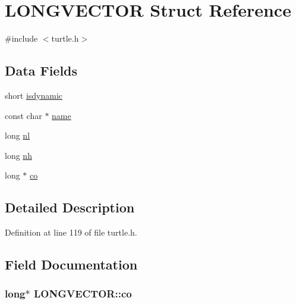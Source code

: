 \hypertarget{struct_l_o_n_g_v_e_c_t_o_r}{\section{L\-O\-N\-G\-V\-E\-C\-T\-O\-R Struct Reference}
\label{struct_l_o_n_g_v_e_c_t_o_r}
}


{\ttfamily \#include $<$turtle.\-h$>$}

\subsection*{Data Fields}
\begin{DoxyCompactItemize}
\item 
short \hyperlink{struct_l_o_n_g_v_e_c_t_o_r_a8a2b78c0cfb3a6b507f3eb1b40544c48}{isdynamic}
\item 
const char $\ast$ \hyperlink{struct_l_o_n_g_v_e_c_t_o_r_a16a7061f53bb42703ef57db54d5909ac}{name}
\item 
long \hyperlink{struct_l_o_n_g_v_e_c_t_o_r_ae4781cf6040d079de5f054f77eb33a17}{nl}
\item 
long \hyperlink{struct_l_o_n_g_v_e_c_t_o_r_ac39f7d4fdc7e3886bcd38177fc6eb4fc}{nh}
\item 
long $\ast$ \hyperlink{struct_l_o_n_g_v_e_c_t_o_r_a8f171b5ad53ab4b1c974e177f06f0b34}{co}
\end{DoxyCompactItemize}


\subsection{Detailed Description}


Definition at line 119 of file turtle.\-h.



\subsection{Field Documentation}
\hypertarget{struct_l_o_n_g_v_e_c_t_o_r_a8f171b5ad53ab4b1c974e177f06f0b34}{
\subsubsection[{co}]{\setlength{\rightskip}{0pt plus 5cm}long$\ast$ L\-O\-N\-G\-V\-E\-C\-T\-O\-R\-::co}}\label{struct_l_o_n_g_v_e_c_t_o_r_a8f171b5ad53ab4b1c974e177f06f0b34}


